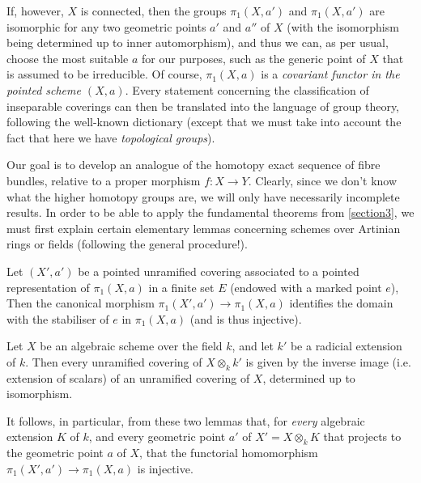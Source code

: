 \documentclass{article}
\theoremstyle{plain}
\newenvironment{lemma}[1]
  {\renewcommand\theinnercustomlemma{#1}\innercustomlemma}
  {\endinnercustomlemma}
\theoremstyle{definition}
\newcommand{\oldpage}[1]{\marginpar{\footnotesize$\Big\vert$ \textit{p.~#1}}}
\begin{document}
If, however, $X$ is connected, then the groups $\pi_1(X,a')$ and $\pi_1(X,a')$ are isomorphic for any two geometric points $a'$ and $a''$ of $X$ (with the isomorphism being determined up to inner automorphism), and thus we can, as per usual, choose the most suitable $a$ for our purposes, such as the generic point of
\oldpage{182-19}
$X$ that is assumed to be irreducible.
Of course, $\pi_1(X,a)$ is a \emph{covariant functor in the pointed scheme $(X,a)$}.
Every statement concerning the classification of inseparable coverings can then be translated into the language of group theory, following the well-known dictionary (except that we must take into account the fact that here we have \emph{topological groups}).

Our goal is to develop an analogue of the homotopy exact sequence of fibre bundles, relative to a proper morphism $f\colon X\to Y$.
Clearly, since we don't know what the higher homotopy groups are, we will only have necessarily incomplete results.
In order to be able to apply the fundamental theorems from \cref{section3}, we must first explain certain elementary lemmas concerning schemes over Artinian rings or fields (following the general procedure!).

\begin{lemma}{1}
\label{lemma1}
  Let $(X',a')$ be a pointed unramified covering associated to a pointed representation of $\pi_1(X,a)$ in a finite set $E$ (endowed with a marked point $e$),
  Then the canonical morphism $\pi_1(X',a')\to\pi_1(X,a)$ identifies the domain with the stabiliser of $e$ in $\pi_1(X,a)$ (and is thus injective).
\end{lemma}

\begin{lemma}{2}
\label{lemma2}
  Let $X$ be an algebraic scheme over the field $k$, and let $k'$ be a radicial extension of $k$.
  Then every unramified covering of $X\otimes_kk'$ is given by the inverse image (i.e. extension of scalars) of an unramified covering of $X$, determined up to isomorphism.
\end{lemma}

It follows, in particular, from these two lemmas that, for \emph{every} algebraic extension $K$ of $k$, and every geometric point $a'$ of $X'=X\otimes_kK$ that projects to the geometric point $a$ of $X$, that the functorial homomorphism $\pi_1(X',a')\to\pi_1(X,a)$ is injective.
\end{document}
